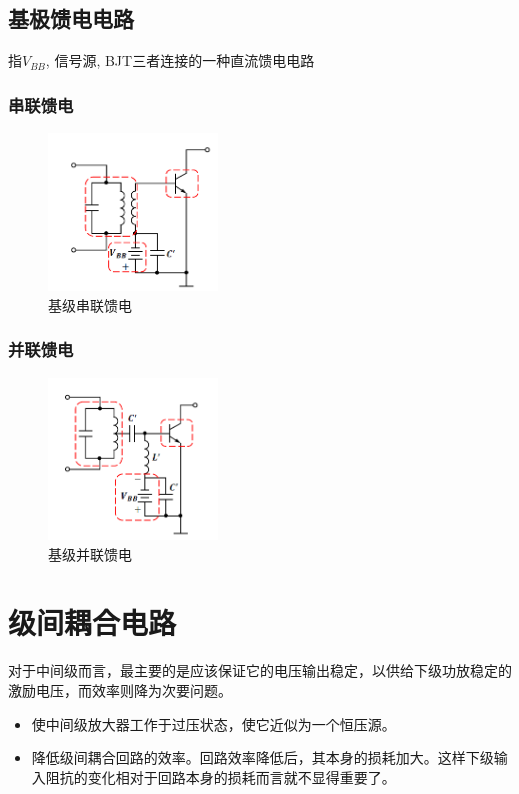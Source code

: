 \documentclass[a4paper]{report}
\begin{document}
\subsection{基极馈电电路}
指$V_{BB}$, 信号源, BJT三者连接的一种直流馈电电路
\subsubsection{串联馈电}
\begin{figure}[H]
  \centering
  \includegraphics[width=0.4\textwidth]{power_res_fb_b_s.png}
  \caption{基级串联馈电}
  \end{figure}
\subsubsection{并联馈电}
\begin{figure}[H]
  \centering
  \includegraphics[width=0.4\textwidth]{power_res_fb_b_p.png}
  \caption{基级并联馈电}
  \end{figure}

\section{级间耦合电路}
对于中间级而言，最主要的是应该保证它的电压输出稳定，以供给下级功放稳定的激励电压，而效率则降为次要问题。
\begin{itemize}
  \item 使中间级放大器工作于过压状态，使它近似为一个恒压源。
  \item 降低级间耦合回路的效率。回路效率降低后，其本身的损耗加大。这样下级输入阻抗的变化相对于回路本身的损耗而言就不显得重要了。
\end{itemize}
\end{document}
